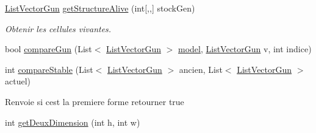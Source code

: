 \begin{DoxyCompactItemize}
\mbox{\hyperlink{class_list_vector_gun}{List\+Vector\+Gun}} \mbox{\hyperlink{class_detection_gun_a488d963e0b78922904b6bd42182ca7b1}{get\+Structure\+Alive}} (int\mbox{[},,\mbox{]} stock\+Gen)
\begin{DoxyCompactList}\small\item\em Obtenir les cellules vivantes. \end{DoxyCompactList}\item 
bool \mbox{\hyperlink{class_detection_gun_a0ca849e6a37b8734261999c4f8f64523}{compare\+Gun}} (List$<$ \mbox{\hyperlink{class_list_vector_gun}{List\+Vector\+Gun}} $>$ \mbox{\hyperlink{class_detection_gun_a0c8ad0d86d7f0a02de8a120cffae1337}{model}}, \mbox{\hyperlink{class_list_vector_gun}{List\+Vector\+Gun}} v, int indice)
\item 
int \mbox{\hyperlink{class_detection_gun_af0283c67f8fe041c2ff8ded541054d56}{compare\+Stable}} (List$<$ \mbox{\hyperlink{class_list_vector_gun}{List\+Vector\+Gun}} $>$ ancien, List$<$ \mbox{\hyperlink{class_list_vector_gun}{List\+Vector\+Gun}} $>$ actuel)
\begin{DoxyCompactList}\small\item\em \begin{DoxyReturn}{Renvoie}
si c\textquotesingle{}est la premiere forme retourner true 
\end{DoxyReturn}
\end{DoxyCompactList}\item 
int \mbox{\hyperlink{class_detection_gun_a2bd76f00286c4916cc9e525e9e4403bb}{get\+Deux\+Dimension}} (int h, int w)
\end{DoxyCompactItemize}
